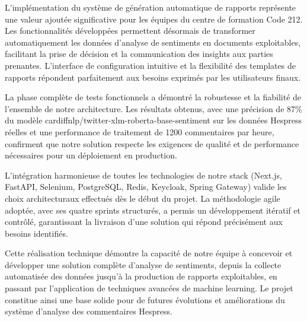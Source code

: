 L'implémentation du système de génération automatique de rapports représente une valeur ajoutée significative pour les équipes du centre de formation Code 212. Les fonctionnalités développées permettent désormais de transformer automatiquement les données d'analyse de sentiments en documents exploitables, facilitant la prise de décision et la communication des insights aux parties prenantes. L'interface de configuration intuitive et la flexibilité des templates de rapports répondent parfaitement aux besoins exprimés par les utilisateurs finaux.

La phase complète de tests fonctionnels a démontré la robustesse et la fiabilité de l'ensemble de notre architecture. Les résultats obtenus, avec une précision de 87\% du modèle cardiffnlp/twitter-xlm-roberta-base-sentiment sur les données Hespress réelles et une performance de traitement de 1200 commentaires par heure, confirment que notre solution respecte les exigences de qualité et de performance nécessaires pour un déploiement en production.

L'intégration harmonieuse de toutes les technologies de notre stack (Next.js, FastAPI, Selenium, PostgreSQL, Redis, Keycloak, Spring Gateway) valide les choix architecturaux effectués dès le début du projet. La méthodologie agile adoptée, avec ses quatre sprints structurés, a permis un développement itératif et contrôlé, garantissant la livraison d'une solution qui répond précisément aux besoins identifiés.

Cette réalisation technique démontre la capacité de notre équipe à concevoir et développer une solution complète d'analyse de sentiments, depuis la collecte automatisée des données jusqu'à la production de rapports exploitables, en passant par l'application de techniques avancées de machine learning. Le projet constitue ainsi une base solide pour de futures évolutions et améliorations du système d'analyse des commentaires Hespress.